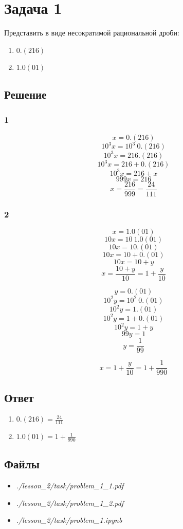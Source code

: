 \section*{Задача 1}

Представить в виде несократимой рациональной дроби:

\begin{enumerate}
  \item \( 0.(216 )\)
  \item \( 1.0(01 )\)
\end{enumerate}

\subsection*{Решение}

\subsubsection*{1}

\[ x = 0.(216) \]
\[ 10^3 x = 10^3\ 0.(216) \]
\[ 10^3 x = 216.(216) \]
\[ 10^3 x = 216 + 0.(216) \]
\[ 10^3 x = 216 + x \]
\[ 999 x = 216 \]
\[ x = \frac{216}{999} = \frac{24}{111} \]

\subsubsection*{2}

\[ x = 1.0(01) \]
\[ 10 x = 10\ 1.0(01) \]
\[ 10 x = 10.(01) \]
\[ 10 x = 10 + 0.(01) \]
\[ 10 x = 10 + y \]
\[ x = \frac{10 + y}{10} = 1 + \frac{y}{10} \]

\[ y = 0.(01) \]
\[ 10^2 y = 10^2\ 0.(01) \]
\[ 10^2 y = 1.(01) \]
\[ 10^2 y = 1 + 0.(01) \]
\[ 10^2 y = 1 + y \]
\[ 99 y = 1 \]
\[ y = \frac{1}{99} \]

\[ x = 1 + \frac{y}{10} = 1 + \frac{1}{990} \]

\subsection*{Ответ}

\begin{enumerate}
  \item \( 0.(216) = \frac{24}{111} \)
  \item \( 1.0(01) = 1 + \frac{1}{990} \)
\end{enumerate}

\subsection*{Файлы}

\begin{itemize}
  \item \textit{./lesson\_2/task/problem\_1\_1.pdf}
  \item \textit{./lesson\_2/task/problem\_1\_2.pdf}
  \item \textit{./lesson\_2/task/problem\_1.ipynb}
\end{itemize}
